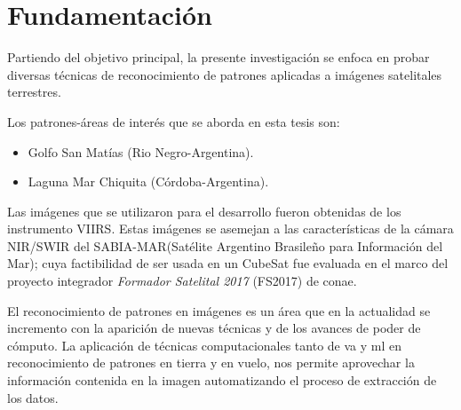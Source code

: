 \section{Fundamentación}\label{sec:fundamentacion}
Partiendo del objetivo principal, la presente investigación se enfoca en probar diversas técnicas de reconocimiento de patrones aplicadas a imágenes satelitales terrestres.  

Los patrones-áreas de interés que se aborda en esta tesis son:
\begin{itemize}
	\item Golfo San Matías (Rio Negro-Argentina).
	\item Laguna Mar Chiquita (Córdoba-Argentina).
\end{itemize}

Las imágenes que se utilizaron para el desarrollo fueron obtenidas de los instrumento  VIIRS. Estas imágenes se asemejan a las características de la cámara NIR/SWIR del SABIA-MAR(Satélite Argentino Brasileño para Información del Mar); cuya factibilidad de ser usada en un CubeSat fue evaluada en el marco del proyecto integrador \textit{Formador Satelital 2017} (FS2017) de \ac{conae}.

El reconocimiento de patrones en imágenes es un área que en la actualidad se incremento con la aparición de nuevas técnicas y de los avances de poder de cómputo. La aplicación de técnicas computacionales tanto de  \ac{va} y \ac{ml} en reconocimiento de patrones  en tierra y en vuelo, nos permite aprovechar la información contenida en la imagen  automatizando el proceso de extracción de los datos.

